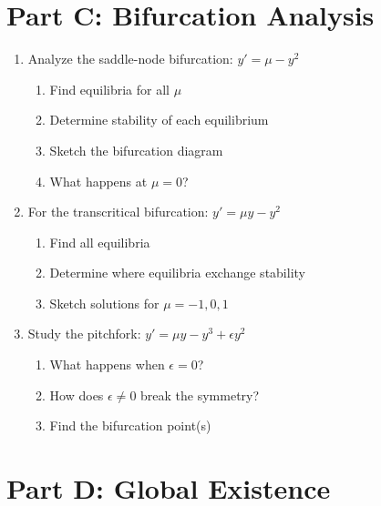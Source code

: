 \documentclass[12pt]{article}
\begin{document}
\section*{Part C: Bifurcation Analysis}

\begin{enumerate}[start=9]
    \item Analyze the saddle-node bifurcation: $y' = \mu - y^2$
    \begin{enumerate}[label=(\alph*)]
        \item Find equilibria for all $\mu$
        \item Determine stability of each equilibrium
        \item Sketch the bifurcation diagram
        \item What happens at $\mu = 0$?
    \end{enumerate}
    
    \item For the transcritical bifurcation: $y' = \mu y - y^2$
    \begin{enumerate}[label=(\alph*)]
        \item Find all equilibria
        \item Determine where equilibria exchange stability
        \item Sketch solutions for $\mu = -1, 0, 1$
    \end{enumerate}
    
    \item Study the pitchfork: $y' = \mu y - y^3 + \epsilon y^2$
    \begin{enumerate}[label=(\alph*)]
        \item What happens when $\epsilon = 0$?
        \item How does $\epsilon \neq 0$ break the symmetry?
        \item Find the bifurcation point(s)
    \end{enumerate}
\end{enumerate}

\section*{Part D: Global Existence}
\end{document}
